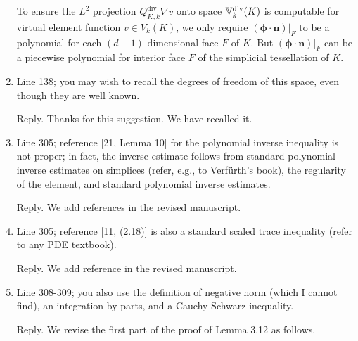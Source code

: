 \documentclass[10pt]{amsart}
\theoremstyle{definition}
\theoremstyle{remark}
\renewcommand{\div}{\operatorname{div}}
\begin{document}
\begin{enumerate}[1.]
To ensure the $L^2$ projection
$Q_{K,k}^{\div}\nabla v$ onto space $\mathbb{V}_{k}^{\rm div}(K)$ is computable
for virtual element function $v\in V_k(K)$, we only require
$(\boldsymbol{\phi}\cdot\boldsymbol{n})|_F$ to be a polynomial for each $(d-1)$-dimensional face $F$ of $K$. But $(\boldsymbol{\phi}\cdot\boldsymbol{n})|_F$ can be a piecewise polynomial for interior face $F$ of the simplicial tessellation of $K$.


\medskip

\item \textsf{Line 138; you may wish to recall the degrees of freedom of this space, even though they are well known.}

\smallskip \noindent \textcolor[rgb]{1.00,0.00,0.00}{Reply.}
Thanks for this suggestion. We have recalled it.


\medskip

\item \textsf{Line 305; reference [21, Lemma 10] for the polynomial inverse inequality is not proper; in fact, the inverse estimate follows from standard polynomial inverse estimates on simplices (refer, e.g., to Verf{\"u}rth's book), the regularity of the element, and standard polynomial inverse estimates.}

\smallskip \noindent \textcolor[rgb]{1.00,0.00,0.00}{Reply.}
We add references \cite{Ciarlet1978,Verfuerth2013} in the revised manuscript.

\medskip

\item \textsf{Line 305; reference [11, (2.18)] is also a standard scaled trace inequality (refer to any PDE textbook).}

\smallskip \noindent \textcolor[rgb]{1.00,0.00,0.00}{Reply.}
We add reference \cite[Theorem 1.5.1.10]{Grisvard1985} in the revised manuscript.

\medskip

\item \textsf{Line 308-309; you also use the definition of negative norm (which I cannot find), an integration by parts, and a Cauchy-Schwarz inequality.}

\smallskip \noindent \textcolor[rgb]{1.00,0.00,0.00}{Reply.}
We revise the first part of the proof of Lemma 3.12 as follows.


\end{enumerate}
\end{document}
